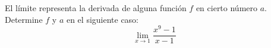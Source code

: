 \item El límite representa la derivada de alguna función $f$ en cierto número $a$. Determine $f$ y $a$ en el siguiente caso:
$$\lim_{x \to 1} \frac{x^9 - 1}{x - 1}$$
